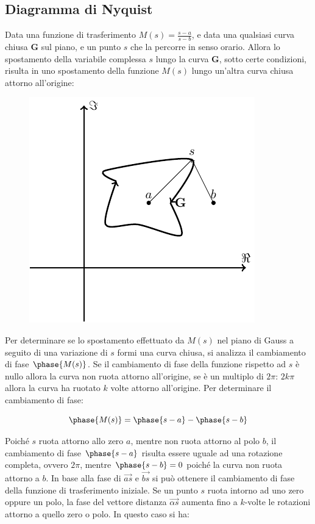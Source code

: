 \documentclass{article}
\numberwithin{equation}{subsection}
\begin{document}
\subsection{Diagramma di Nyquist}
Data una funzione di trasferimento $M(s)=\displaystyle\frac{s-a}{s-b}$, e data una qualsiasi curva chiusa $\mathbf{G}$ sul piano, e un punto $s$ che la percorre in senso 
orario. Allora lo spostamento della variabile complessa $s$ lungo la curva $\mathbf{G}$, sotto certe condizioni, risulta in uno spostamento della funzione $M(s)$ lungo un'altra 
curva chiusa attorno all'origine: 
\begin{figure}[H]%
    \centering
    \includegraphics{nyquist-1.pdf}%
\end{figure}

Per determinare se lo spostamento effettuato da $M(s)$ nel piano di Gauss a seguito di una variazione di $s$ formi una curva chiusa, si analizza il cambiamento di 
fase $\phase{M(s)}$. Se il cambiamento di fase della funzione rispetto ad $s$ è nullo allora la curva non ruota attorno all'origine, se è un multiplo di $2\pi$: $2k\pi$ 
allora la curva ha ruotato $k$ volte attorno all'origine. Per determinare il cambiamento di fase: 

\begin{equation*}
    \phase{M(s)}=\phase{s-a}-\phase{s-b}\\
\end{equation*}

Poiché $s$ ruota attorno allo zero $a$, mentre non ruota attorno al polo $b$, il cambiamento di fase $\phase{s-a}$ risulta essere uguale ad una rotazione completa, ovvero 
$2\pi$, mentre $\phase{s-b}=0$ poiché la curva non ruota attorno a $b$. In base alla fase di $\vec{as}$ e $\vec{bs}$ si può ottenere il cambiamento di fase della funzione 
di trasferimento iniziale. Se un punto $s$ ruota intorno ad uno zero oppure un polo, la fase del vettore distanza $\vec{\alpha s}$ aumenta fino a $k$-volte le rotazioni 
attorno a quello zero o polo. In questo caso si ha:
\end{document}
